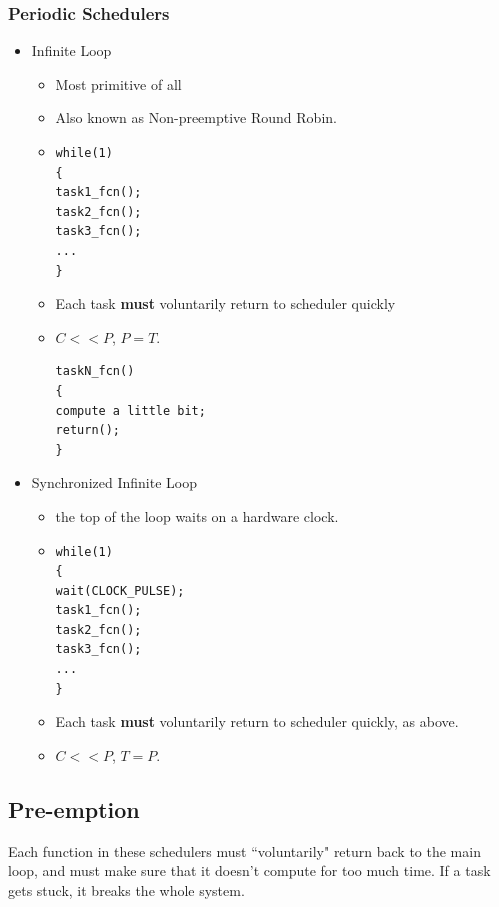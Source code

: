 \documentclass{article}	%
\begin{document}
\subsubsection{Periodic Schedulers}
\begin{itemize}	%

        \item	%
Infinite Loop
        \begin{itemize}
                \item Most primitive of all
                \item Also known as Non-preemptive Round Robin.
                \item \begin{verbatim}
while(1)
{
task1_fcn();
task2_fcn();
task3_fcn();
...
}
                \end{verbatim}
                \item Each task {\bf must} voluntarily return to
                scheduler quickly
                \item $C << P$, $P=T$.

\begin{verbatim}
taskN_fcn()
{
compute a little bit;
return();
}
\end{verbatim}
      \end{itemize}



        \item	%
Synchronized Infinite Loop
        \begin{itemize}
                \item the top of the loop waits on a hardware clock.
                \item \begin{verbatim}
while(1)
{
wait(CLOCK_PULSE);
task1_fcn();
task2_fcn();
task3_fcn();
...
}
                \end{verbatim}
                \item Each task {\bf must} voluntarily return to
                scheduler quickly, as above.
                \item $C << P$, $T=P$.
        \end{itemize}

\end{itemize}	%

\subsection{Pre-emption}
Each function in these schedulers must ``voluntarily" return back to the main loop, 
and must make sure that it doesn't compute for too much time.   If a task gets
stuck, it breaks the whole system.  
\end{document}
